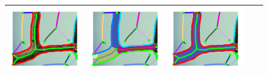 \begin{figure}[pht]
\begin{tabular}{|c|c|c|c|c|}
\includegraphics[width=0.16\linewidth]{figs/42049_00_rc_after_shocks.pdf} &
\includegraphics[width=0.16\linewidth]{figs/42049_00_rc_before_frags.pdf} &
\includegraphics[width=0.16\linewidth]{figs/42049_00_rc_after_frags.pdf}\\
\hline


\end{tabular}
\end{figure}
